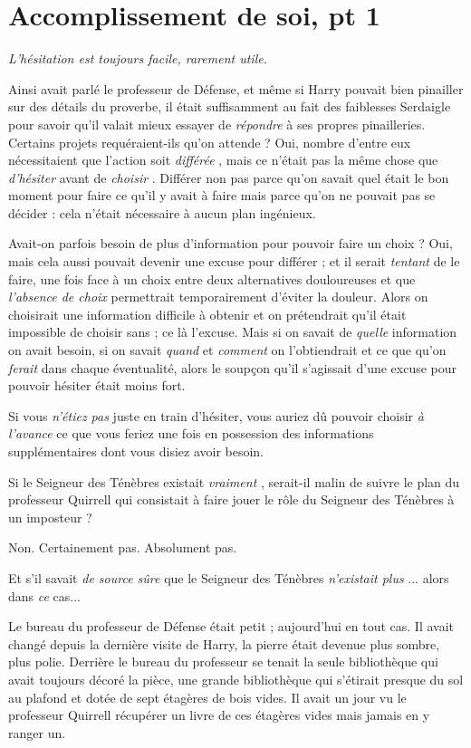 
\chapter{Accomplissement de soi, pt 1}

\emph{L'hésitation est toujours facile, rarement utile.} 

Ainsi avait parlé le professeur de Défense, et même si Harry pouvait bien pinailler sur des détails du proverbe, il était suffisamment au fait des faiblesses Serdaigle pour savoir qu'il valait mieux essayer de \emph{répondre}  à ses propres pinailleries. Certains projets requéraient-ils qu'on attende ? Oui, nombre d'entre eux nécessitaient que l'action soit \emph{différée} , mais ce n'était pas la même chose que \emph{d'hésiter}  avant de \emph{choisir} . Différer non pas parce qu'on savait quel était le bon moment pour faire ce qu'il y avait à faire mais parce qu'on ne pouvait pas se décider : cela n'était nécessaire à aucun plan ingénieux.

Avait-on parfois besoin de plus d'information pour pouvoir faire un choix ? Oui, mais cela aussi pouvait devenir une excuse pour différer ; et il serait \emph{tentant}  de le faire, une fois face à un choix entre deux alternatives douloureuses et que \emph{l'absence de choix}  permettrait temporairement d'éviter la douleur. Alors on choisirait une information difficile à obtenir et on prétendrait qu'il était impossible de choisir sans ; ce là l'excuse. Mais si on savait de \emph{quelle}  information on avait besoin, si on savait \emph{quand}  et \emph{comment}  on l'obtiendrait et ce que qu'on \emph{ferait } dans chaque éventualité, alors le soupçon qu'il s'agissait d'une excuse pour pouvoir hésiter était moins fort.

Si vous \emph{n'étiez pas } juste en train d'hésiter, vous auriez dû pouvoir choisir \emph{à l'avance}  ce que vous feriez une fois en possession des informations supplémentaires dont vous disiez avoir besoin.

Si le Seigneur des Ténèbres existait \emph{vraiment} , serait-il malin de suivre le plan du professeur Quirrell qui consistait à faire jouer le rôle du Seigneur des Ténèbres à un imposteur ?

Non. Certainement pas. Absolument pas.

Et s'il savait \emph{de source sûre}  que le Seigneur des Ténèbres \emph{n'existait plus} ... alors dans \emph{ce } cas...

Le bureau du professeur de Défense était petit ; aujourd'hui en tout cas. Il avait changé depuis la dernière visite de Harry, la pierre était devenue plus sombre, plus polie. Derrière le bureau du professeur se tenait la seule bibliothèque qui avait toujours décoré la pièce, une grande bibliothèque qui s'étirait presque du sol au plafond et dotée de sept étagères de bois vides. Il avait un jour vu le professeur Quirrell récupérer un livre de ces étagères vides mais jamais en y ranger un.

